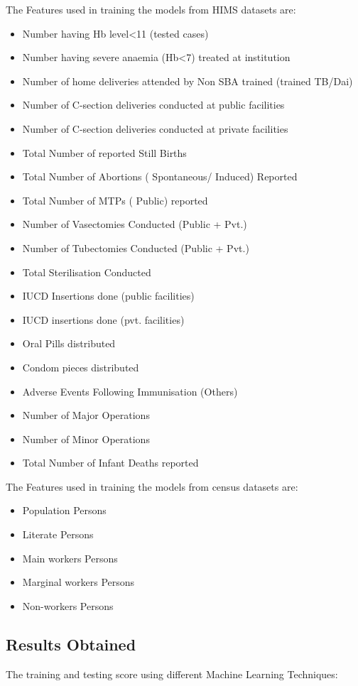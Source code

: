 \documentclass[]{article}
\begin{document}
The Features used in training the models from HIMS datasets are:
\begin{itemize}
\item Number having Hb level<11 (tested cases) 
\item Number having severe anaemia (Hb<7) treated at institution 
\item  Number of home deliveries attended by Non SBA trained (trained TB/Dai)
\item Number of C-section deliveries conducted at public facilities 
\item Number of C-section deliveries conducted at private facilities
\item Total Number of reported Still Births
\item Total Number of Abortions ( Spontaneous/ Induced) Reported
\item Total Number of MTPs ( Public) reported
\item Number of Vasectomies Conducted (Public + Pvt.)
\item Number of Tubectomies Conducted (Public + Pvt.)
\item Total Sterilisation Conducted
\item IUCD Insertions done (public facilities)
\item IUCD insertions done (pvt. facilities)
\item Oral Pills distributed
\item Condom pieces distributed
\item Adverse Events Following Immunisation (Others)
\item Number of Major Operations
\item Number of Minor Operations
\item Total Number of Infant Deaths reported
\end{itemize}

The Features used in training the models from census datasets are:
\begin{itemize}
\item Population Persons
\item Literate Persons
\item Main workers Persons
\item Marginal workers Persons
\item Non-workers Persons
\end{itemize}

\newpage
\subsection{Results Obtained}
The training and testing score using different Machine Learning Techniques:
\end{document}
